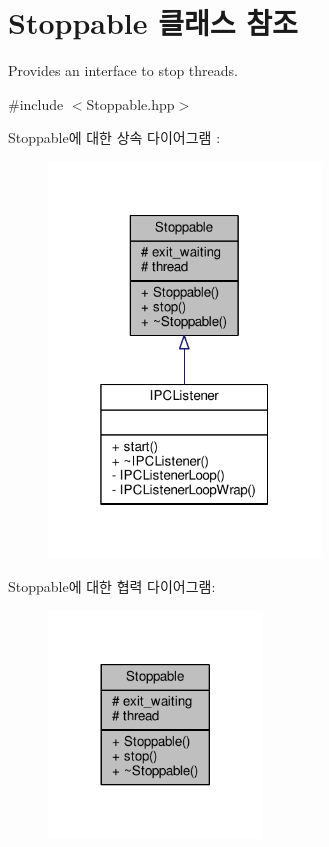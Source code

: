 \hypertarget{class_stoppable}{}\section{Stoppable 클래스 참조}
\label{class_stoppable}


Provides an interface to stop threads.  




{\ttfamily \#include $<$Stoppable.\+hpp$>$}



Stoppable에 대한 상속 다이어그램 \+: 
\nopagebreak
\begin{figure}[H]
\begin{center}
\leavevmode
\includegraphics[width=205pt]{class_stoppable__inherit__graph}
\end{center}
\end{figure}


Stoppable에 대한 협력 다이어그램\+:
\nopagebreak
\begin{figure}[H]
\begin{center}
\leavevmode
\includegraphics[width=161pt]{class_stoppable__coll__graph}
\end{center}
\end{figure}
